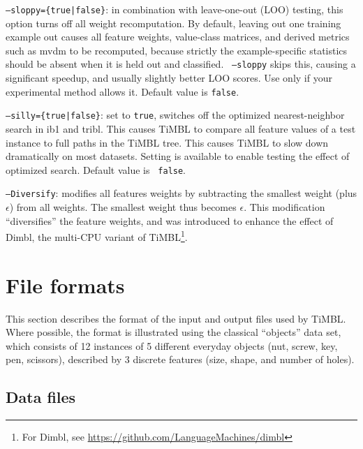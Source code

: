 \documentclass{book}
\begin{document}
\begin{description}
\item {\tt --sloppy=\{true|false\}}: in combination with leave-one-out
  (LOO) testing, this option turns off all weight recomputation. By
  default, leaving out one training example out causes all feature
  weights, value-class matrices, and derived metrics such as {\sc
    mvdm} to be recomputed, because strictly the example-specific
  statistics should be absent when it is held out and classified. {\tt
    --sloppy} skips this, causing a significant speedup, and usually
  slightly better LOO scores. Use only if your experimental method
  allows it. Default value is {\tt false}.
\item {\tt --silly=\{true|false\}}: set to {\tt true}, switches off
  the optimized nearest-neighbor search in {\sc ib1} and {\sc
    tribl}. This causes TiMBL to compare all feature values of a test
  instance to full paths in the TiMBL tree. This causes TiMBL to slow
  down dramatically on most datasets. Setting is available to enable
  testing the effect of optimized search. Default value is {\tt
    false}.
\item{\tt --Diversify}: modifies all features weights by subtracting
  the smallest weight (plus $\epsilon$) from all weights. The smallest
  weight thus becomes $\epsilon$. This modification ``diversifies''
  the feature weights, and was introduced to enhance the effect of
  {\sc Dimbl}, the multi-CPU variant of TiMBL\footnote{For {\sc
      Dimbl}, see \url{https://github.com/LanguageMachines/dimbl}}.
\end{description}

\section{File formats}
\label{fileformats}

This section describes the format of the input and output files used
by TiMBL. Where possible, the format is illustrated using the
classical ``objects'' data set, which consists of 12 instances of 5
different everyday objects (nut, screw, key, pen, scissors), described
by 3 discrete features (size, shape, and number of holes).

\subsection{Data files}
\label{dataformats}
\end{document}
